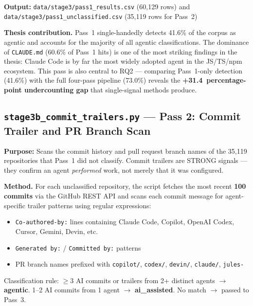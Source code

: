 \documentclass[11pt,a4paper]{article}
\begin{document}
\textbf{Output:}
\texttt{data/stage3/pass1\_results.csv} (60,129 rows) and
\texttt{data/stage3/pass1\_unclassified.csv} (35,119 rows for Pass~2)

\begin{outputbox}
\textbf{Thesis contribution.}
Pass~1 single-handedly detects 41.6\% of the corpus as agentic and accounts
for the majority of all agentic classifications. The dominance of
\texttt{CLAUDE.md} (60.6\% of Pass~1 hits) is one of the most striking
findings in the thesis: Claude Code is by far the most widely adopted
agent in the JS/TS/npm ecosystem. This pass is also central to RQ2 ---
comparing Pass~1-only detection (41.6\%) with the full four-pass pipeline
(73.0\%) reveals the \textbf{+31.4~percentage-point undercounting gap}
that single-signal methods produce.
\end{outputbox}

\newpage

\subsection*{\texttt{stage3b\_commit\_trailers.py} --- Pass 2: Commit Trailer and PR Branch Scan}

\begin{infobox}
\textbf{Purpose:} Scans the commit history and pull request branch names
of the 35,119 repositories that Pass~1 did not classify.
Commit trailers are STRONG signals --- they confirm an agent
\emph{performed} work, not merely that it was configured.
\end{infobox}

\textbf{Method.}
For each unclassified repository, the script fetches the most recent
\textbf{100 commits} via the GitHub REST API and scans each commit message
for agent-specific trailer patterns using regular expressions:
\begin{itemize}
  \item \texttt{Co-authored-by:} lines containing Claude Code, Copilot,
        OpenAI Codex, Cursor, Gemini, Devin, etc.
  \item \texttt{Generated by:} / \texttt{Committed by:} patterns
  \item PR branch names prefixed with \texttt{copilot/}, \texttt{codex/},
        \texttt{devin/}, \texttt{claude/}, \texttt{jules-}
\end{itemize}
Classification rule: $\geq 3$ AI commits or trailers from 2+ distinct agents
$\rightarrow$ \textbf{agentic}. 1--2 AI commits from 1 agent $\rightarrow$
\textbf{ai\_assisted}. No match $\rightarrow$ passed to Pass~3.
\end{document}
